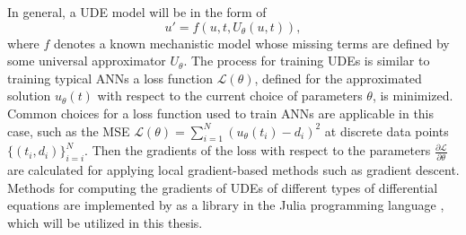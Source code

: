 In general, a \gls{UDE} model will be in the form of \cite{rackauckasUniversalDifferentialEquations2020}
\begin{equation*}
    u' = f(u, t, U_\theta(u, t)),
\end{equation*}
where $f$ denotes a known mechanistic model whose missing terms are defined by some universal approximator $U_\theta$.
The process for training \glspl{UDE} is similar to training typical \glspl{ANN} a loss function $\mathcal{L}(\theta)$, defined for the approximated solution $u_\theta(t)$ with respect to the current choice of parameters $\theta$, is minimized.
Common choices for a loss function used to train \glspl{ANN} are applicable in this case, such as the \gls{MSE} $\mathcal{L}(\theta) = \sum_{i=1}^{N} (u_\theta(t_i) - d_i)^2$ at discrete data points $\{(t_i, d_i)\}_{i=i}^N$.
Then the gradients of the loss with respect to the parameters $\frac{\partial\mathcal{L}}{\partial\theta}$ are calculated for applying local gradient-based methods such as gradient descent.
Methods for computing the gradients of \glspl{UDE} of different types of differential equations are implemented by \citeauthor{rackauckasUniversalDifferentialEquations2020} \cite{rackauckasUniversalDifferentialEquations2020} as a library in the Julia programming language \cite{bezanson2012julia}, which will be utilized in this thesis.